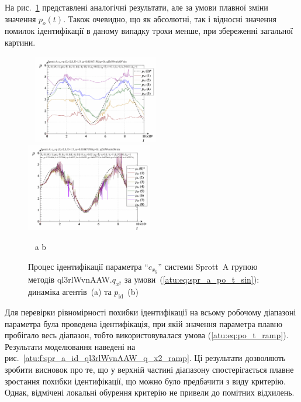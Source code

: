 На рис.~\ref{atu:f:spr_a_id_ql3rlWvnAAW_q_x2_sin} представлені аналогічні
результати, але за умови плавної зміни значення
$p_o(t)$. Також очевидно, що як абсолютні, так і відносні значення
помилок ідентифікації в даному випадку трохи менше, при
збереженні загальної картини.

\begin{figure}[htb!]
\begin{center}
  ~ \hfill
    \includegraphics[width=0.49\textwidth]{p/cha/spr_a/ql3rlWvnAAW_x2/sprott_a_id-p_t_pi_ql3rlWvnAAW_sin.png}
    \hfill
    \includegraphics[width=0.49\textwidth]{p/cha/spr_a/ql3rlWvnAAW_x2/sprott_a_id-p_t_p_ql3rlWvnAAW_sin.png}
  \hfill ~
\end{center}
  \vspace{-1.0ex}
  \begin{center}
    ~ \hfill a \hfill\hfill b \hfill ~
  \end{center}
\caption{Процес ідентифікації параметра ``$c_{x_y}$'' системи Sprott~A групою методів ql3rlWvnAAW.$q_{x^2}$ за умови~(\ref{atu:eq:spr_a_po_t_sin}): динаміка агентів~(a) та $p_\mathrm{id}$~(b)}
  \label{atu:f:spr_a_id_ql3rlWvnAAW_q_x2_sin}
\end{figure}

Для перевірки рівномірності похибки ідентифікації на всьому
робочому діапазоні параметра була проведена ідентифікація,
при якій значення параметра плавно пробігало весь діапазон,
тобто використовувалася умова (\ref{atu:eq:po_t_ramp}). Результати
моделювання наведені на рис.~\ref{atu:f:spr_a_id_ql3rlWvnAAW_q_x2_ramp}. Ці
результати дозволяють зробити висновок про те, що у верхній
частині діапазону спостерігається плавне зростання похибки
ідентифікації, що можно було предбачити з виду критерію. Однак, відмічені
локальні обурення критерію не привели до помітних відхилень.


